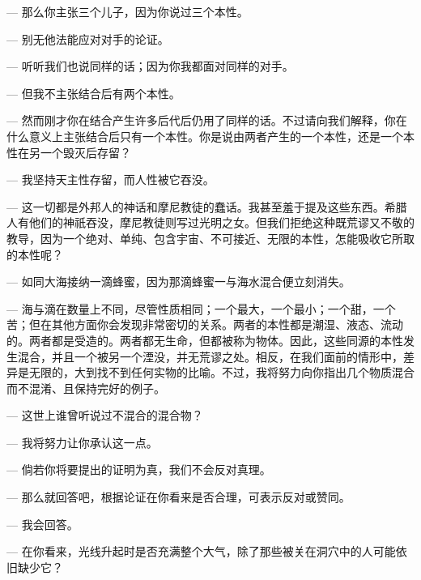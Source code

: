 — 那么你主张三个儿子，因为你说过三个本性。\par

— 别无他法能应对对手的论证。\par

— 听听我们也说同样的话；因为你我都面对同样的对手。\par

— 但我不主张结合后有两个本性。\par

— 然而刚才你在结合产生许多后代后仍用了同样的话。不过请向我们解释，你在什么意义上主张结合后只有一个本性。你是说由两者产生的一个本性，还是一个本性在另一个毁灭后存留？\par

— 我坚持天主性存留，而人性被它吞没。\par

— 这一切都是外邦人的神话和摩尼教徒的蠢话。我甚至羞于提及这些东西。希腊人有他们的神祇吞没，摩尼教徒则写过光明之女。但我们拒绝这种既荒谬又不敬的教导，因为一个绝对、单纯、包含宇宙、不可接近、无限的本性，怎能吸收它所取的本性呢？\par

— 如同大海接纳一滴蜂蜜，因为那滴蜂蜜一与海水混合便立刻消失。\par

— 海与滴在数量上不同，尽管性质相同；一个最大，一个最小；一个甜，一个苦；但在其他方面你会发现非常密切的关系。两者的本性都是潮湿、液态、流动的。两者都是受造的。两者都无生命，但都被称为物体。因此，这些同源的本性发生混合，并且一个被另一个湮没，并无荒谬之处。相反，在我们面前的情形中，差异是无限的，大到找不到任何实物的比喻。不过，我将努力向你指出几个物质混合而不混淆、且保持完好的例子。\par

— 这世上谁曾听说过不混合的混合物？\par

— 我将努力让你承认这一点。\par

— 倘若你将要提出的证明为真，我们不会反对真理。\par

— 那么就回答吧，根据论证在你看来是否合理，可表示反对或赞同。\par

— 我会回答。\par

— 在你看来，光线升起时是否充满整个大气，除了那些被关在洞穴中的人可能依旧缺少它？\par

